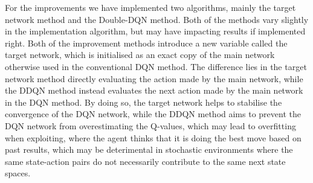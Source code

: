 For the improvements we have implemented two algorithms, mainly the target network method and the Double-DQN method. Both of the methods vary slightly in the implementation algorithm, but may have impacting results if implemented right. Both of the improvement methods introduce a new variable called the target network, which is initialised as an exact copy of the main network otherwise used in the conventional DQN method. The difference lies in the target network method directly evaluating the action made by the main network, while the DDQN method instead evaluates the next action made by the main network in the DQN method. By doing so, the target network helps to stabilise the convergence of the DQN network, while the DDQN method aims to prevent the DQN network from overestimating the Q-values, which may lead to overfitting when exploiting, where the agent thinks that it is doing the best move based on past results, which may be deterimental in stochastic environments where the same state-action pairs do not necessarily contribute to the same next state spaces.
